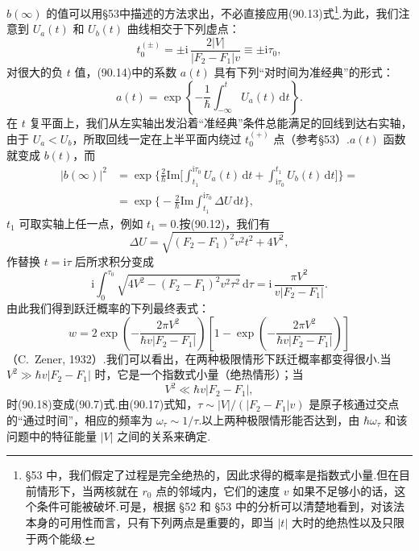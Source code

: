 $b(\infty)$ 的值可以用§53中描述的方法求出，不必直接应用(90.13)式\footnote{§53 中，我们假定了过程是完全绝热的，因此求得的概率是指数式小量.但在目前情形下，当两核就在 $r_0$ 点的邻域内，它们的速度 $v$ 如果不足够小的话，这个条件可能被破坏.可是，根据 §52 和 §53 中的分析可以清楚地看到，对该法本身的可用性而言，只有下列两点是重要的，即当 $|t|$ 大时的绝热性以及只限于两个能级.}.为此，我们注意到 $U_a(t)$ 和 $U_b(t)$ 曲线相交于下列虚点：
\begin{equation}
  t_0^{(\pm)}=\pm\mathrm{i}\,\frac{2|V|}{|F_2-F_1|v}\equiv\pm\mathrm{i}\tau_0,
\end{equation}
对很大的负 $t$ 值，(90.14)中的系数 $a(t)$ 具有下列“对时间为准经典”的形式：
\begin{equation*}
  a(t)=\exp\left\{-\frac{1}{\hbar}\int_{-\infty}^t U_a(t)\,\mathrm{d}t\right\}.
\end{equation*}
在 $t$ 复平面上，我们从左实轴出发沿着“准经典”条件总能满足的回线到达右实轴，由于 $U_a<U_b$，所取回线一定在上半平面内绕过 $t_0^{(+)}$ 点（参考§53）.$a(t)$ 函数就变成 $b(t)$，而
\begin{equation*}
\begin{aligned}
  |b(\infty)|^2&=\exp\bigg\{\frac{2}{\hbar}\mathrm{Im}\bigg[\int_{t_1}^{\mathrm{i}\tau_0}U_a(t)\,\mathrm{d}t
  +\int_{\mathrm{i}\tau_0}^{t_1}U_b(t)\,\mathrm{d}t\bigg]\bigg\}=\\
  &=\exp\bigg\{-\frac{2}{\hbar}\mathrm{Im}\int_{t_1}^{\mathrm{i}\tau_0}\Delta U\,\mathrm{d}t\bigg\},
\end{aligned}
\end{equation*}
$t_1$ 可取实轴上任一点，例如 $t_1=0$.按(90.12)，我们有
\begin{equation}
  \Delta U=\sqrt{(F_2-F_1)^2v^2t^2+4V^2},
\end{equation}
作替换 $t=\mathrm{i}\tau$ 后所求积分变成
\begin{equation*}
  \mathrm{i}\int_0^{\tau_0}\sqrt{4V^2-(F_2-F_1)^2v^2\tau^2}\,\mathrm{d}\tau
  =\mathrm{i}\,\frac{\pi V^2}{v|F_2-F_1|}.
\end{equation*}
由此我们得到跃迁概率的下列最终表式：
\begin{equation}
  w=2\exp\left(-\frac{2\pi V^2}{\hbar v|F_2-F_1|}\right)
  \left[1-\exp\left(-\frac{2\pi V^2}{\hbar v|F_2-F_1|}\right)\right]
\end{equation}
（C.~Zener, 1932）.我们可以看出，在两种极限情形下跃迁概率都变得很小.当 $V^2\gg\hbar v|F_2-F_1|$ 时，它是一个指数式小量（绝热情形）；当
\begin{equation}
  V^2\ll\hbar v|F_2-F_1|,
\end{equation}
时(90.18)变成(90.7)式.由(90.17)式知，$\tau\sim|V|/(|F_2-F_1|v)$ 是原子核通过交点的“通过时间”，相应的频率为 $\omega_\tau\sim1/\tau$.以上两种极限情形能否达到，由 $\hbar\omega_\tau$ 和该问题中的特征能量 $|V|$ 之间的关系来确定.


